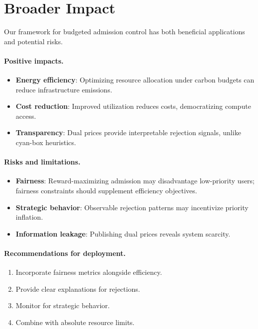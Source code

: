 \documentclass[11pt]{article}
\begin{document}
\section{Broader Impact}
\label{app:ethics}

Our framework for budgeted admission control has both beneficial applications and potential risks.

\paragraph{Positive impacts.}
\begin{itemize}[leftmargin=*]
    \item \textbf{Energy efficiency}: Optimizing resource allocation under carbon budgets can reduce infrastructure emissions.
    \item \textbf{Cost reduction}: Improved utilization reduces costs, democratizing compute access.
    \item \textbf{Transparency}: Dual prices provide interpretable rejection signals, unlike cyan-box heuristics.
\end{itemize}

\paragraph{Risks and limitations.}
\begin{itemize}[leftmargin=*]
    \item \textbf{Fairness}: Reward-maximizing admission may disadvantage low-priority users; fairness constraints should supplement efficiency objectives.
    \item \textbf{Strategic behavior}: Observable rejection patterns may incentivize priority inflation.
    \item \textbf{Information leakage}: Publishing dual prices reveals system scarcity.
\end{itemize}

\paragraph{Recommendations for deployment.}
\begin{enumerate}[leftmargin=*]
    \item Incorporate fairness metrics alongside efficiency.
    \item Provide clear explanations for rejections.
    \item Monitor for strategic behavior.
    \item Combine with absolute resource limits.
\end{enumerate}
\end{document}
